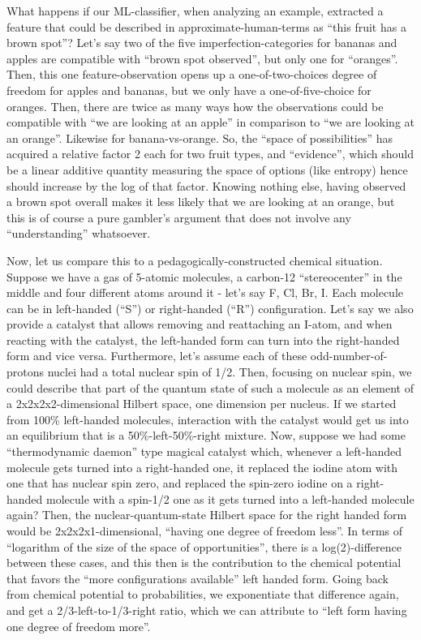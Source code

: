 \documentclass[11pt]{article}
\begin{document}
What happens if our ML-classifier, when analyzing an example, extracted
a feature that could be described in approximate-human-terms as ``this
fruit has a brown spot''? Let's say two of the five
imperfection-categories for bananas and apples are compatible with
``brown spot observed'', but only one for ``oranges''. Then, this one
feature-observation opens up a one-of-two-choices degree of freedom for
apples and bananas, but we only have a one-of-five-choice for oranges.
Then, there are twice as many ways how the observations could be
compatible with ``we are looking at an apple'' in comparison to ``we are
looking at an orange''. Likewise for banana-vs-orange. So, the ``space
of possibilities'' has acquired a relative factor 2 each for two fruit
types, and ``evidence'', which should be a linear additive quantity
measuring the space of options (like entropy) hence should increase by
the log of that factor. Knowing nothing else, having observed a brown
spot overall makes it less likely that we are looking at an orange, but
this is of course a pure gambler's argument that does not involve any
``understanding'' whatsoever.

Now, let us compare this to a pedagogically-constructed chemical
situation. Suppose we have a gas of 5-atomic molecules, a carbon-12
``stereocenter'' in the middle and four different atoms around it -
let's say F, Cl, Br, I. Each molecule can be in left-handed (``S'') or
right-handed (``R'') configuration. Let's say we also provide a catalyst
that allows removing and reattaching an I-atom, and when reacting with
the catalyst, the left-handed form can turn into the right-handed form
and vice versa. Furthermore, let's assume each of these
odd-number-of-protons nuclei had a total nuclear spin of 1/2. Then,
focusing on nuclear spin, we could describe that part of the quantum
state of such a molecule as an element of a 2x2x2x2-dimensional Hilbert
space, one dimension per nucleus. If we started from 100\% left-handed
molecules, interaction with the catalyst would get us into an
equilibrium that is a 50\%-left-50\%-right mixture. Now, suppose we had
some ``thermodynamic daemon'' type magical catalyst which, whenever a
left-handed molecule gets turned into a right-handed one, it replaced
the iodine atom with one that has nuclear spin zero, and replaced the
spin-zero iodine on a right-handed molecule with a spin-1/2 one as it
gets turned into a left-handed molecule again? Then, the
nuclear-quantum-state Hilbert space for the right handed form would be
2x2x2x1-dimensional, ``having one degree of freedom less''. In terms of
``logarithm of the size of the space of opportunities'', there is a
log(2)-difference between these cases, and this then is the contribution
to the chemical potential that favors the ``more configurations
available'' left handed form. Going back from chemical potential to
probabilities, we exponentiate that difference again, and get a
2/3-left-to-1/3-right ratio, which we can attribute to ``left form
having one degree of freedom more''.
\end{document}
